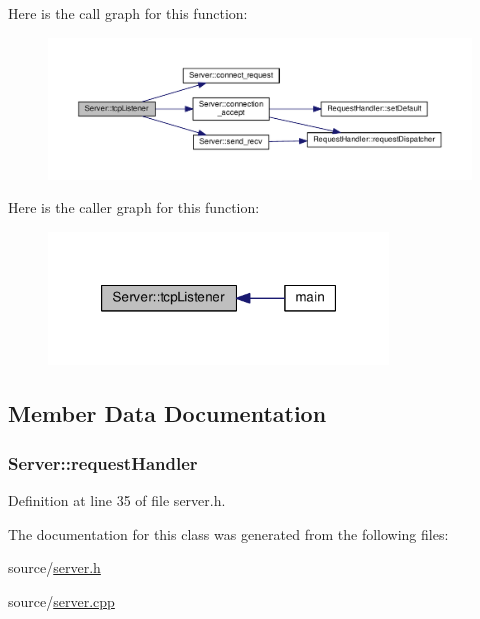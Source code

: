 Here is the call graph for this function\+:
\nopagebreak
\begin{figure}[H]
\begin{center}
\leavevmode
\includegraphics[width=350pt]{class_server_a040742461af78653870017c356d5a226_cgraph}
\end{center}
\end{figure}




Here is the caller graph for this function\+:
\nopagebreak
\begin{figure}[H]
\begin{center}
\leavevmode
\includegraphics[width=256pt]{class_server_a040742461af78653870017c356d5a226_icgraph}
\end{center}
\end{figure}




\subsection{Member Data Documentation}
\subsubsection[{\texorpdfstring{request\+Handler}{requestHandler}}]{ Server\+::request\+Handler}\hypertarget{class_server_a2d4af75a0372efec768c76179e6aef78}{}\label{class_server_a2d4af75a0372efec768c76179e6aef78}


Definition at line 35 of file server.\+h.



The documentation for this class was generated from the following files\+:\begin{DoxyCompactItemize}
\item 
source/\hyperlink{server_8h}{server.\+h}\item 
source/\hyperlink{server_8cpp}{server.\+cpp}\end{DoxyCompactItemize}
